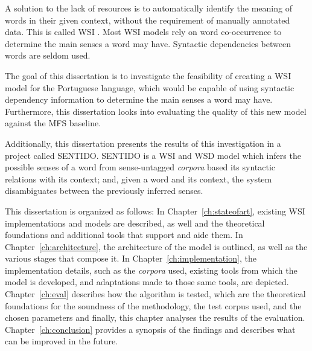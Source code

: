 A solution to the lack of resources is to automatically identify the meaning of
words in their given context, without the requirement of manually annotated
data. This is called \ac{WSI} \citep{agirre2007semeval}. Most \ac{WSI} models 
rely on word co-occurrence to determine the main senses a word may have. 
Syntactic dependencies between words are seldom used.



The goal of this dissertation is to investigate the feasibility of creating a
\ac{WSI} model for the Portuguese language, which would be capable of using 
syntactic dependency information to determine the main senses a word may have. 
Furthermore, this dissertation looks into evaluating the quality 
of this new model against the \ac{MFS} baseline.


Additionally, this dissertation presents the results of this investigation in
a project called \ac{SENTIDO}. \ac{SENTIDO} is a \ac{WSI} and \ac{WSD} model
which infers the possible senses of a word from sense-untagged \emph{corpora} based its syntactic relations with its context; and, given a word and its context, the system disambiguates between the previously inferred senses.


This dissertation is organized as follows: In Chapter~\ref{ch:stateofart}, existing \ac{WSI} implementations and models are described, as well and the theoretical foundations and additional tools that support and aide them. In Chapter~\ref{ch:architecture}, the architecture of the model is outlined, as well as the various stages that compose it. In Chapter~\ref{ch:implementation}, the implementation details, such as the \emph{corpora} used, existing tools from which the model is developed, and adaptations made to those same tools, are depicted. Chapter~\ref{ch:eval} describes how the algorithm is tested, which are the theoretical foundations for the soundness of the methodology, the test corpus used, and the chosen parameters and finally, this chapter analyses the results of the evaluation. Chapter~\ref{ch:conclusion} provides a synopsis of the findings and describes what can be improved in the future.

